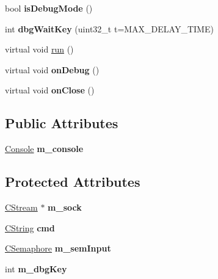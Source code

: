 \begin{DoxyCompactItemize}
\item 
\hypertarget{class_c_shell_ae0f6cb34ee627c44b1690d16d76d628f}{bool {\bfseries is\-Debug\-Mode} ()}\label{class_c_shell_ae0f6cb34ee627c44b1690d16d76d628f}

\item 
\hypertarget{class_c_shell_a7731a22b0b80a4facc431f6e07db2599}{int {\bfseries dbg\-Wait\-Key} (uint32\-\_\-t t=M\-A\-X\-\_\-\-D\-E\-L\-A\-Y\-\_\-\-T\-I\-M\-E)}\label{class_c_shell_a7731a22b0b80a4facc431f6e07db2599}

\item 
virtual void \hyperlink{class_c_shell_a1565a93fad9a1e35e05a597889ad130f}{run} ()
\item 
\hypertarget{class_c_shell_a74d294faaebd969b295366f4a861cf02}{virtual void {\bfseries on\-Debug} ()}\label{class_c_shell_a74d294faaebd969b295366f4a861cf02}

\item 
\hypertarget{class_c_shell_a27a37bf5a22eaba1426655409decc188}{virtual void {\bfseries on\-Close} ()}\label{class_c_shell_a27a37bf5a22eaba1426655409decc188}

\end{DoxyCompactItemize}
\subsection*{Public Attributes}
\begin{DoxyCompactItemize}
\item 
\hypertarget{class_c_shell_ac555f42f70f60653dbd5e0c8ec9c4dcf}{\hyperlink{class_console}{Console} {\bfseries m\-\_\-console}}\label{class_c_shell_ac555f42f70f60653dbd5e0c8ec9c4dcf}

\end{DoxyCompactItemize}
\subsection*{Protected Attributes}
\begin{DoxyCompactItemize}
\item 
\hypertarget{class_c_shell_ab0eaa18213db8965c68f978538050162}{\hyperlink{class_c_stream}{C\-Stream} $\ast$ {\bfseries m\-\_\-sock}}\label{class_c_shell_ab0eaa18213db8965c68f978538050162}

\item 
\hypertarget{class_c_shell_aa5ef2d56e802b9925cf0ae7d36741bda}{\hyperlink{class_c_string}{C\-String} {\bfseries cmd}}\label{class_c_shell_aa5ef2d56e802b9925cf0ae7d36741bda}

\item 
\hypertarget{class_c_shell_aa81828c40c17f38821ec395aaf38ee98}{\hyperlink{class_c_semaphore}{C\-Semaphore} {\bfseries m\-\_\-sem\-Input}}\label{class_c_shell_aa81828c40c17f38821ec395aaf38ee98}

\item 
\hypertarget{class_c_shell_ab2b6ca1616128e6a8a05c8c235c7b011}{int {\bfseries m\-\_\-dbg\-Key}}\label{class_c_shell_ab2b6ca1616128e6a8a05c8c235c7b011}

\end{DoxyCompactItemize}
